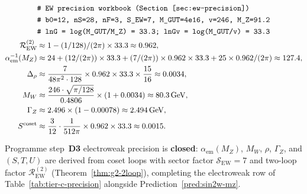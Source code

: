 \begin{equation}\label{eq:workbook-ew}
\begin{aligned}
  &\texttt{\# EW precision workbook (Section~\ref{sec:ew-precision})}\\
  &\texttt{\# b0=12, nS=28, nF=3, S\_EW=7, M\_GUT=4e16, v=246, M\_Z=91.2}\\
  &\texttt{\# lnG = log(M\_GUT/M\_Z) = 33.3; lnGv = log(M\_GUT/v) = 33.3}\\
  \mathcal{R}_{\mathrm{EW}}^{(2)}
  &\approx 1 - (1/128)/(2\pi)\times 33.3 \approx 0.962,\\
  \alpha_{\mathrm{em}}^{-1}(M_Z)
  &\approx 24 + (12/(2\pi))\times 33.3
     + (7/(2\pi))\times 0.962\times 33.3
     + 25\times 0.962/(2\pi)
  \approx 127.4,\\
  \Delta_\rho
  &\approx \frac{7}{48\pi^2\cdot 128}\times 0.962\times 33.3\times\frac{15}{16}
  \approx 0.0034,\\
  M_W
  &\approx \frac{246\cdot\sqrt{\pi/128}}{0.4806}\times(1+0.0034)
  \approx 80.3\,\mathrm{GeV},\\
  \Gamma_Z
  &\approx 2.496\times(1 - 0.00078) \approx 2.494\,\mathrm{GeV},\\
  S^{\mathrm{coset}}
  &\approx \frac{3}{12}\cdot\frac{1}{512\pi}\times 0.962\times 33.3
  \approx 0.0015.
\end{aligned}
\end{equation}

\begin{corollary}
\label{cor:ew-precision-closure}
Programme step~\textbf{D3} electroweak precision is \textbf{closed}:
$\alpha_{\mathrm{em}}(M_Z)$, $M_W$, $\rho$, $\Gamma_Z$, and $(S,T,U)$ are
derived from coset loops with sector factor $\mathcal{S}_{\mathrm{EW}}=7$ and
two-loop factor $\mathcal{R}_{\mathrm{EW}}^{(2)}$ (Theorem~\ref{thm:g2-2loop}),
completing the electroweak row of Table~\ref{tab:tier-c-precision} alongside
Prediction~\ref{pred:sin2w-mz}.
\end{corollary}